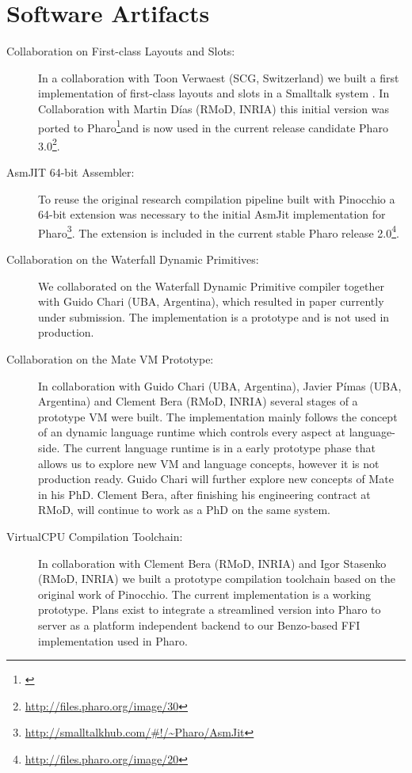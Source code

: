 \section{Software Artifacts}

\begin{description}
	\item[Collaboration on First-class Layouts and Slots:]
In a collaboration with Toon Verwaest (SCG, Switzerland) we built a first implementation of first-class layouts and slots in a Smalltalk system \cite{Verw11a}.
In Collaboration with Martin Días (RMoD, INRIA) this initial version was ported to Pharo\footnote{\url{}}and is now used in the current release candidate Pharo 3.0\footnote{\url{http://files.pharo.org/image/30}}.

	\item[AsmJIT 64-bit Assembler:]
To reuse the original research compilation pipeline built with Pinocchio \cite{Verw10a, Brun11a} a 64-bit extension was necessary to the initial AsmJit implementation for Pharo\footnote{\url{http://smalltalkhub.com/\#!/~Pharo/AsmJit}}.
The extension is included in the current stable Pharo release 2.0\footnote{\url{http://files.pharo.org/image/20}}.

	\item[Collaboration on the Waterfall Dynamic Primitives:]
We collaborated on the Waterfall Dynamic Primitive compiler together with Guido Chari (UBA, Argentina), which resulted in paper currently under submission\cite{Char13a}.
The implementation is a prototype and is not used in production.

	\item[Collaboration on the Mate VM Prototype:]
In collaboration with Guido Chari (UBA, Argentina), Javier Pímas (UBA, Argentina) and Clement Bera (RMoD, INRIA) several stages of a prototype VM were built.
The implementation mainly follows the concept of an dynamic language runtime which controls every aspect at language-side.
The current language runtime is in a early prototype phase that allows us to explore new VM and language concepts, however it is not production ready.
Guido Chari will further explore new concepts of Mate in his PhD.
Clement Bera, after finishing his engineering contract at RMoD, will continue to work as a PhD on the same system.

	\item[VirtualCPU Compilation Toolchain:]
In collaboration with Clement Bera (RMoD, INRIA) and Igor Stasenko (RMoD, INRIA) we built a prototype compilation toolchain based on the original work of Pinocchio.
The current implementation is a working prototype.
Plans exist to integrate a streamlined version into Pharo to server as a platform independent backend to our Benzo-based FFI implementation used in Pharo.


\end{description}

